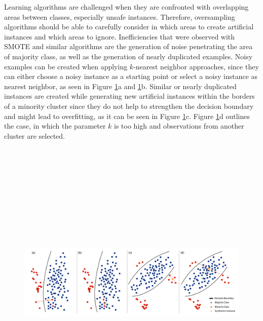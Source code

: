 \documentclass[parskip=full]{scrartcl}
\begin{document}
Learning algorithms are challenged when they are confronted with overlapping areas between classes, especially unsafe instances. Therefore, oversampling algorithms should be able to carefully consider in which areas to create artificial instances and which areas to ignore. Inefficiencies that were observed with SMOTE and similar algorithms are the generation of noise penetrating the area of majority class, as well as the generation of nearly duplicated examples. Noisy examples can be created when applying $k$-nearest neighbor approaches, since they can either choose a noisy instance as a starting point or select a noisy instance as nearest neighbor, as seen in Figure \ref{fig:Douzas}a and \ref{fig:Douzas}b. Similar or nearly duplicated instances are created while generating new artificial instances within the borders of a minority cluster since they do not help to strengthen the decision boundary and might lead to overfitting, as it can be seen in Figure \ref{fig:Douzas}c. Figure \ref{fig:Douzas}d outlines the case, in which the parameter $k$ is too high and observations from another cluster are selected.

\begin{figure}[H]
	\centering
	\includegraphics[width=16.5cm, height=14cm, keepaspectratio]{../../analysis/gsomo/fig3.png}
	\label{fig:Douzas}
\end{figure}
\end{document}
